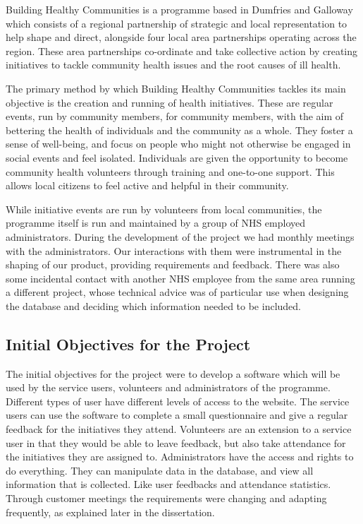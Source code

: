 \documentclass{l3proj}
\begin{document}
Building Healthy Communities is a programme based in Dumfries and Galloway which consists of a regional partnership of strategic and local representation to help shape and direct, alongside four local area partnerships operating across the region. These area partnerships co-ordinate and take collective action by creating initiatives to tackle community health issues and the root causes of ill health.

The primary method by which Building Healthy Communities tackles its main objective is the creation and running of health initiatives. These are regular events, run by community members, for community members, with the aim of bettering the health of individuals and the community as a whole. They foster a sense of well-being, and focus on people who might not otherwise be engaged in social events and feel isolated. Individuals are given the opportunity to become community health volunteers through training and one-to-one support. This allows local citizens to feel active and helpful in their community.

While initiative events are run by volunteers from local communities, the programme itself is run and maintained by a group of NHS employed administrators. During the development of the project we had monthly meetings with the administrators. Our interactions with them were instrumental in the shaping of our product, providing requirements and feedback. There was also some incidental contact with another NHS employee from the same area running a different project, whose technical advice was of particular use when designing the database and deciding which information needed to be included.

\subsection{Initial Objectives for the Project}
\label{sec:initial-objectives}

The initial objectives for the project were to develop a software which will be used by the service users, volunteers and administrators of the programme. Different types of user have different levels of access to the website. The service users can use the software to complete a small questionnaire and give a regular feedback for the initiatives they attend. Volunteers are an extension to a service user in that they would be able to leave feedback, but also take attendance for the initiatives they are assigned to. Administrators have the access and rights to do everything. They can manipulate data in the database, and view all information that is collected. Like user feedbacks and attendance statistics. Through customer meetings the requirements were changing and adapting frequently, as explained later in the dissertation.
\end{document}
